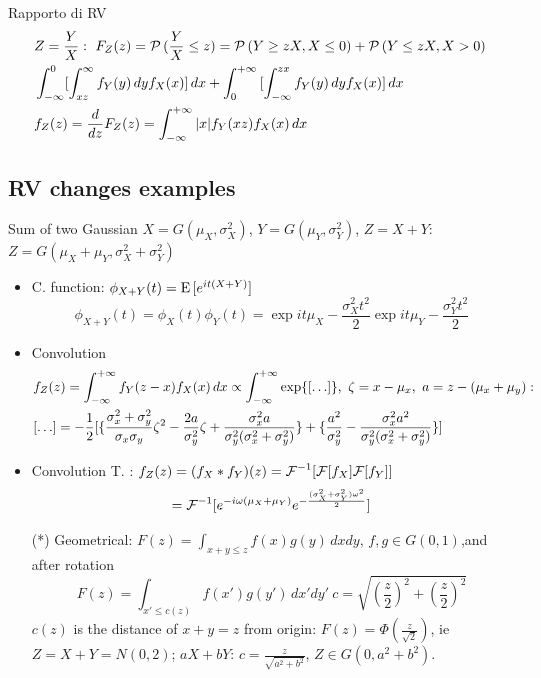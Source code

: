 \documentclass[asd-beamer.tex]{subfiles}%
\begin{document}
\begin{frame}{Rapporto di RV}
    \begin{align*}
        &Z=\frac{Y}{X}:\ F_Z(z)=\operatorname{\mathcal{P}}{(\frac{Y}{X}\leq z)}=\operatorname{\mathcal{P}}{(Y\geq zX,X\leq0)}+\operatorname{\mathcal{P}}{(Y\leq zX,X>0)}\\
        &\int_{-\infty}^0[\int_{xz}^{\infty}f_Y(y)\,dyf_X(x)]\,dx+\int_{0}^{+\infty}{}[\int_{-\infty}^{zx}f_Y(y)\,dyf_X(x)]\,dx\\
        &f_Z(z)=\frac{d}{d z}F_Z(z)=\int_{-\infty}^{+\infty}{}|x|f_Y(xz)f_X(x)\,dx
    \end{align*}
\end{frame}

\subsection{RV changes examples}

\begin{frame}{Sum of two Gaussian}
$X=G(\mu_X,\sigma_X^2)$, $Y=G(\mu_Y,\sigma_Y^2)$, $Z=X+Y$: $Z=G(\mu_X+\mu_Y,\sigma_X^2+\sigma_Y^2)$
\begin{itemize}
\item C. function: $\phi_{X+Y}(t)=\operatorname{E}{[e^{it(X+Y)} ]}$
\[\phi_{X+Y}(t)=\phi_X(t)\phi_Y(t)=\exp{it\mu_X-\frac{\sigma_X^2t^2}{2}}\exp{it\mu_Y-\frac{\sigma_Y^2t^2}{2}}\]
\item Convolution 
\begin{align*}
&f_Z(z)=\int_{-\infty}^{+\infty}{}f_Y(z-x)f_X(x)\,dx\propto\int_{-\infty}^{+\infty}{}\text{exp}\{[\ldots]\},\ \zeta=x-\mu_x,\ a=z-(\mu_x+\mu_y):\\
&[\ldots]=-\frac{1}{2}[\{\frac{\sigma_x^2+\sigma_y^2}{\sigma_x\sigma_y}\zeta^2-\frac{2a}{\sigma_y^2}\zeta+\frac{\sigma_x^2a}{\sigma_y^2(\sigma_x^2+\sigma_y^2)}\}+\{\frac{a^2}{\sigma_y^2}-\frac{\sigma_x^2a^2}{\sigma_y^2(\sigma_x^2+\sigma_y^2)}\}]
\end{align*}
\item Convolution T. : $f_Z(z)=(f_X*f_Y)(z)={\mathcal{F}{}}^{-1}[\mathcal{F}{[f_X]}\mathcal{F}{[f_Y]}]$
\[={\mathcal{F}{}}^{-1}[e^{-i\omega(\mu_X+\mu_Y)}e^{-\frac{(\sigma_X^2+\sigma_Y^2)\omega^2}{2}}]\]
\item[(*)] Geometrical: $F(z)=\int_{x+y\leq z}f(x)g(y)\,dxdy$, $f,g\in G(0,1)$,and after rotation
\[F(z)=\int_{x'\leq c(z)}f(x')g(y')\,dx'dy'\ c=\sqrt{(\frac{z}{2})^2+(\frac{z}{2})^2}\]
$c(z)$ is the distance of $x+y=z$ from origin: $F(z)=\Phi(\frac{z}{\sqrt{2}})$, ie $Z=X+Y=N(0,2)$; $aX+bY$: $c=\frac{z}{\sqrt{a^2+b^2}}$, $Z\in G(0,a^2+b^2)$.
\end{itemize}
\end{frame}
\end{document}
